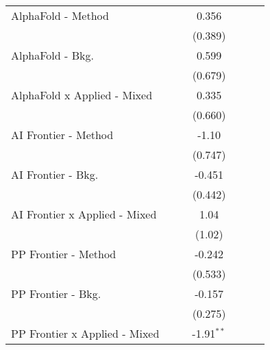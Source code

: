 \begin{tabular}{lcccccc}
   AlphaFold - Method             &               &              & 0.356         &               &        &   \\   
                                  &               &              & (0.389)       &               &        &   \\   
   AlphaFold - Bkg.               &               &              & 0.599         &               &        &   \\   
                                  &               &              & (0.679)       &               &        &   \\   
   AlphaFold x Applied - Mixed    &               &              & 0.335         &               &        &   \\   
                                  &               &              & (0.660)       &               &        &   \\   
   AI Frontier - Method           &               &              & -1.10         &               &        &   \\   
                                  &               &              & (0.747)       &               &        &   \\   
   AI Frontier - Bkg.             &               &              & -0.451        &               &        &   \\   
                                  &               &              & (0.442)       &               &        &   \\   
   AI Frontier x Applied - Mixed  &               &              & 1.04          &               &        &   \\   
                                  &               &              & (1.02)        &               &        &   \\   
   PP Frontier - Method           &               &              & -0.242        &               &        &   \\   
                                  &               &              & (0.533)       &               &        &   \\   
   PP Frontier - Bkg.             &               &              & -0.157        &               &        &   \\   
                                  &               &              & (0.275)       &               &        &   \\   
   PP Frontier x Applied - Mixed  &               &              & -1.91$^{**}$  &               &        &   \\   

\end{tabular}
